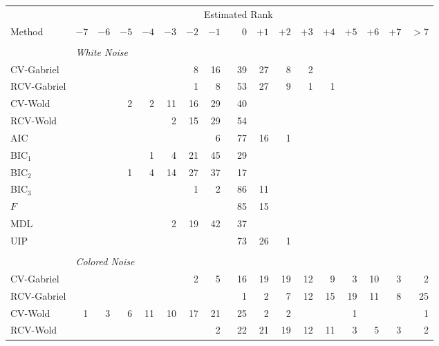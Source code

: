 \begin{table}\label{T:rank-est-weak-sparse}
    \tiny
    \centering
    \begin{tabular}{lrrrrrrrrrrrrrrrr}
        \toprule
        &\multicolumn{15}{c}{\scriptsize{Estimated Rank}} \\
        \cmidrule{2-17}
        \scriptsize{Method}
            & $-7$ & $-6$ & $-5$ & $-4$ & $-3$ & $-2$ & $-1$ 
            & $\phantom{+}0$ 
            & $+1$ & $+2$ & $+3$ & $+4$ & $+5$ & $+6$ & $+7$ & $> 7$ \\
        \midrule
        \\
        &\multicolumn{16}{l}{\scriptsize{\textit{White Noise}}} \\
CV-Gabriel &  &  &  &  &  &  8 &  16 &  39 &  27 &  8 &  2 &  &  &  &  & \\ 
 RCV-Gabriel &  &  &  &  &  &  1 &  8 &  53 &  27 &  9 &  1 &  1 &  &  &  & \\ 
 CV-Wold &  &  &  2 &  2 &  11 &  16 &  29 &  40 &  &  &  &  &  &  &  & \\ 
 RCV-Wold &  &  &  &  &  2 &  15 &  29 &  54 &  &  &  &  &  &  &  & \\ 
 AIC &  &  &  &  &  &  &  6 &  77 &  16 &  1 &  &  &  &  &  & \\ 
 BIC$_1$ &  &  &  &  1 &  4 &  21 &  45 &  29 &  &  &  &  &  &  &  & \\ 
 BIC$_2$ &  &  &  1 &  4 &  14 &  27 &  37 &  17 &  &  &  &  &  &  &  & \\ 
 BIC$_3$ &  &  &  &  &  &  1 &  2 &  86 &  11 &  &  &  &  &  &  & \\ 
 $F$ &  &  &  &  &  &  &  &  85 &  15 &  &  &  &  &  &  & \\ 
 MDL &  &  &  &  &  2 &  19 &  42 &  37 &  &  &  &  &  &  &  & \\ 
 UIP &  &  &  &  &  &  &  &  73 &  26 &  1 &  &  &  &  &  & \\ 
         \\
        &\multicolumn{16}{l}{\scriptsize{\textit{Colored Noise}}} \\
CV-Gabriel &  &  &  &  &  &  2 &  5 &  16 &  19 &  19 &  12 &  9 &  3 &  10 &  3 &  2\\ 
 RCV-Gabriel &  &  &  &  &  &  &  &  1 &  2 &  7 &  12 &  15 &  19 &  11 &  8 &  25\\ 
 CV-Wold &  1 &  3 &  6 &  11 &  10 &  17 &  21 &  25 &  2 &  2 &  &  &  1 &  &  &  1\\ 
 RCV-Wold &  &  &  &  &  &  &  2 &  22 &  21 &  19 &  12 &  11 &  3 &  5 &  3 &  2\\ 

\end{tabular}
\end{table}
